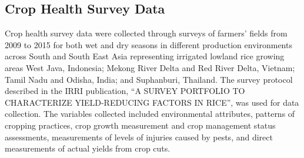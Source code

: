 \subsection*{Crop Health Survey Data}



Crop health survey data were collected through surveys of farmers' fields from 2009 to 2015 for both wet and dry seasons in different production environments across South and South East Asia representing irrigated lowland rice growing areas West Java, Indonesia; Mekong River Delta and Red River Delta, Vietnam; Tamil Nadu and Odisha, India; and Suphanburi, Thailand. The survey protocol described in the IRRI publication, ``A SURVEY PORTFOLIO TO CHARACTERIZE YIELD-REDUCING FACTORS IN RICE'',  was used for data collection. The variables collected included environmental attributes, patterns of cropping practices, crop growth measurement and crop management status assessments, measurements of levels of injuries caused by pests, and direct measurements of actual yields from crop cuts. 


